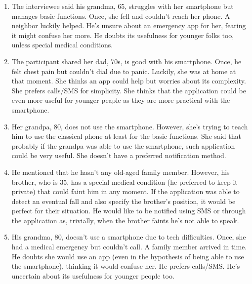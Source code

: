 \documentclass[12pt]{article}
\begin{document}
\begin{enumerate}
    \item The interviewee said his grandma, 65, struggles with her smartphone 
    but manages basic functions. Once, she fell and couldn't reach her phone. A 
    neighbor luckily helped. He's unsure about an emergency app for her, 
    fearing it might confuse her more. He doubts its usefulness for 
    younger folks too, unless special medical conditions.
    
    \item The participant shared her dad, 70s, is good with his smartphone. 
    Once, he felt chest pain but couldn't dial due to panic. Luckily, she 
    was at home at that moment. She thinks an app could help but worries about 
    its complexity. She prefers calls/SMS for simplicity. She thinks that the application 
    could be even more useful for younger peaple as they are more practical with the 
    smartphone.
    
    \item Her grandpa, 80, does not use the smartphone. However, she's trying to 
    teach him to use the classical phone at least for the basic functions. 
    She said that probably if the grandpa was able to use the smartphone, such 
    application could be very useful. She doesn't have a preferred notification 
    method.
    
    \item He mentioned that he hasn't any old-aged family member. However, his 
    brother, who is 35, has a special medical condition (he preferred to keep it 
    private) that could faint him in any moment. If the application was able 
    to detect an eventual fall and also specify the brother's position, it 
    would be perfect for their situation. He would like to be notified using SMS 
    or through the application as, trivially, when the brother faints he's not 
    able to speak. 
    
    \item His grandma, 80, doesn't use a smartphone due to tech difficulties. 
    Once, she had a medical emergency but couldn't call. A family member arrived in time. 
    He doubts she would use an app (even in the hypothesis of being able to use the 
    smartphone), thinking it would confuse her. He prefers calls/SMS. 
    He's uncertain about its usefulness for younger people too.
\end{enumerate}
\end{document}
